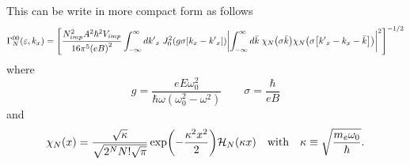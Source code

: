 \noindent
This can be write in more compact form as follows
\begin{equation} \label{5.8}
  \begin{aligned}
    \Gamma^{00}_{N}(\varepsilon,k_x)  =
    \qty[
    \frac { N_{imp}^2 A^2 \hbar^2 V_{imp}}{16\pi^5 \qty(eB)^2}
    \int_{-\infty}^{\infty} d {k'}_x \;
    J_0^2\qty(g\sigma[{k}_x - {k'}_x])
    \qty|
    \int_{-\infty}^{\infty} d\bar{k} \;
    {\chi}_{N}\qty(\sigma\bar{k})
    {\chi}_{N}\qty(\sigma\qty[{k'}_x - {k}_x - \bar{k}])|^2
    ]^{-1/2}
  \end{aligned}
\end{equation}
where
\begin{equation} \label{5.9}
    g = \frac{eE\omega_0^2}{\hbar\omega(\omega_0^2 - \omega^2)} \quad\quad
    \sigma = \frac{\hbar}{eB}
\end{equation}
and
\begin{equation} \label{5.10}
  \chi_N(x) = \frac{\sqrt{\kappa}}{\sqrt{2^{N}N!\sqrt{\pi}}}
  \exp(-\frac{\kappa^2 x^2}{2})
  \mathcal{H}_N\qty(\kappa x) \quad \text{with} \quad
  \kappa \equiv \sqrt{\frac{m_e \omega_0}{\hbar}}.
\end{equation}

